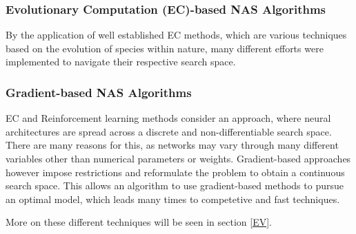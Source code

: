 \documentclass[10pt,        %
               a4paper,     %
               journal,     %
               ]{IEEEtran}
\begin{document}
\subsubsection{\textbf{Evolutionary Computation} (EC)-based NAS Algorithms}
By the application of well established EC methods, which are various techniques based on the evolution of
species within nature, many different efforts were implemented to navigate their respective search space.


\subsubsection{\textbf{Gradient}-based NAS Algorithms}
EC and Reinforcement learning methods consider an approach, where neural architectures
are spread across a discrete and non-differentiable search space. There are many reasons for this, as networks may vary
through many different variables other than numerical parameters or weights. Gradient-based approaches however
impose restrictions and reformulate the problem to obtain a continuous search space. This allows an algorithm
to use gradient-based methods to pursue an optimal model, which leads many times to competetive and fast techniques.


More on these different techniques will be seen in section \ref{EV}.
\end{document}
